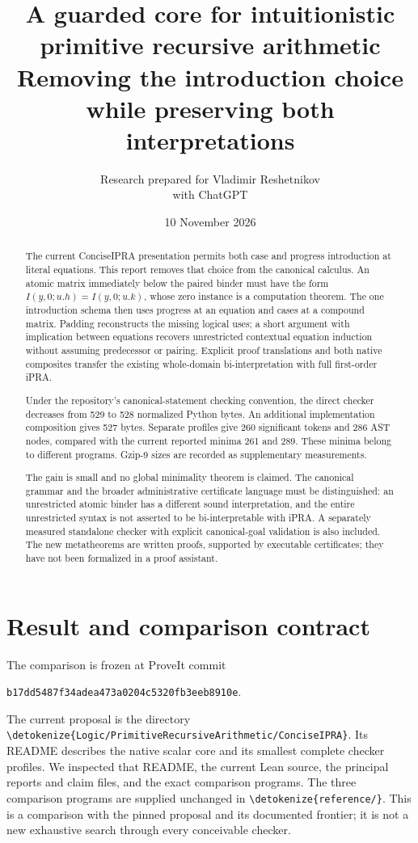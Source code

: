 \documentclass[11pt,letterpaper]{article}
\title{\color{ink}\bfseries A guarded core for intuitionistic\\primitive recursive arithmetic\\[7pt]
\large Removing the introduction choice while preserving both interpretations}
\author{Research prepared for Vladimir Reshetnikov\\with ChatGPT}
\date{10 November 2026}
\theoremstyle{definition}\newtheorem{definition}[theorem]{Definition}
\theoremstyle{remark}\newtheorem{remark}[theorem]{Remark}
\newcommand{\file}[1]{\expandafter\nolinkurl\expandafter{\detokenize{#1}}}
\begin{document}
\maketitle
\begin{abstract}
The current ConciseIPRA presentation permits both case and progress
introduction at literal equations. This report removes that choice from
the canonical calculus. An atomic matrix immediately below the paired
binder must have the form
\(I(y,0;u.h)=I(y,0;u.k)\), whose zero instance is a computation theorem.
The one introduction schema then uses progress at an equation and cases
at a compound matrix. Padding reconstructs the missing logical uses;
a short argument with implication between equations recovers unrestricted
contextual equation induction without assuming predecessor or pairing.
Explicit proof translations and both native composites transfer the
existing whole-domain bi-interpretation with full first-order iPRA.

Under the repository's canonical-statement checking convention, the
direct checker decreases from 529 to 528 normalized Python bytes. An
additional implementation composition gives 527 bytes. Separate profiles
give 260 significant tokens and 286 AST nodes, compared with the current
reported minima 261 and 289. These minima belong to different programs.
Gzip-9 sizes are recorded as supplementary measurements.

The gain is small and no global minimality theorem is claimed. The
canonical grammar and the broader administrative certificate language
must be distinguished: an unrestricted atomic binder has a different
sound interpretation, and the entire unrestricted syntax is not asserted
to be bi-interpretable with iPRA. A separately measured standalone checker
with explicit canonical-goal validation is also included. The new
metatheorems are written proofs, supported by executable certificates;
they have not been formalized in a proof assistant.
\end{abstract}
\clearpage
\setcounter{tocdepth}{1}
\begingroup\small\tableofcontents\endgroup
\clearpage

\section{Result and comparison contract}
\label{sec:result}
The comparison is frozen at ProveIt commit
\begin{center}\small\texttt{b17dd5487f34adea473a0204c5320fb3eeb8910e}.
\end{center}
The current proposal is the directory
\file{Logic/PrimitiveRecursiveArithmetic/ConciseIPRA}. Its README describes
the native scalar core and its smallest complete checker profiles. We
inspected that README, the current Lean source, the principal reports and
claim files, and the exact comparison programs. The three comparison
programs are supplied unchanged in \file{reference/}. This is a
comparison with the pinned proposal and its documented frontier; it is
not a new exhaustive search through every conceivable checker.\cite{snapshot,bytes,tokens,ast}
\end{document}

